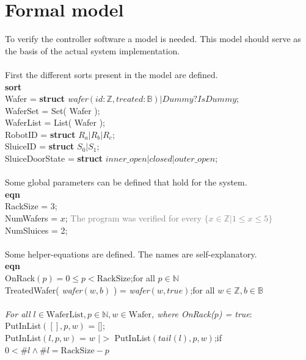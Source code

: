 \documentclass[12pt]{report}
\begin{document}
	\section{Formal model}
	To verify the controller software a model is needed. This model should serve as the basis of the actual system implementation.\\
	\\
	First the different sorts present in the model are defined.\\
	\textbf{sort}\\
	\phantom{----} Wafer = \textbf{struct} \emph{wafer}$( id:\mathbb{Z}, treated:\mathbb{B} ) | Dummy?IsDummy$;\\
	\phantom{----} WaferSet = Set( Wafer );\\
	\phantom{----} WaferList = List( Wafer );\\
	\phantom{----} RobotID = \textbf{struct} $R_a | R_b | R_c$;\\
	\phantom{----} SluiceID = \textbf{struct} $S_0 | S_1$;\\
	\phantom{----} SluiceDoorState = \textbf{struct} $inner\_open|closed|outer\_open$;\\
	\\
	Some global parameters can be defined that hold for the system.\\
	\textbf{eqn}\\
	\phantom{----} RackSize = 3;\\
	\phantom{----} NumWafers = $x$; \textcolor{gray}{The program was verified for every $\{x \in \mathbb{Z} | 1 \leq x \leq 5\}$}\\
	\phantom{----} NumSluices = 2;\\
	\\
	Some helper-equations are defined. The names are self-explanatory.\\
	\textbf{eqn}\\
	\phantom{----} OnRack$( p ) = 0 \leq p < \text{RackSize}$;\hfill for all $p \in \mathbb{N}$\\
	\phantom{----} TreatedWafer(  \emph{wafer}$( w, b )$ ) =  \emph{wafer}$( w, true )$;\hfill for all $w \in \mathbb{Z}, b \in \mathbb{B}$\\
	\\
	\phantom{----} \emph{For all $l \in \text{WaferList}, p \in \mathbb{N}, w \in \text{Wafer}$, where OnRack($p$) = true}:\\
	\phantom{----} PutInList$( [], p, w )$ = [];\\
	\phantom{----} PutInList$( l, p, w )$ = $w$ $|>$ PutInList$( tail( l ), p, w )$;\hfill if $0 < \#l \land \#l = \text{RackSize} - p$\\
\end{document}
